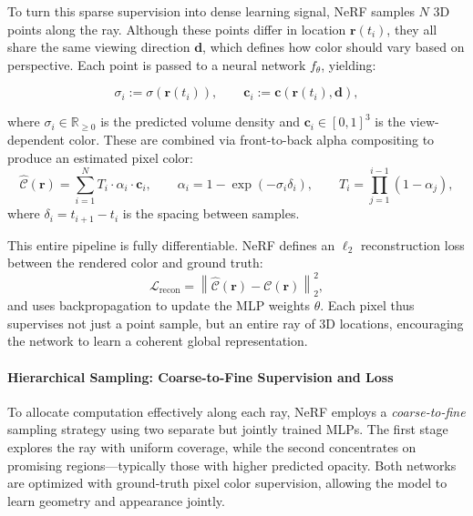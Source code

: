 \medskip

\noindent
To turn this sparse supervision into dense learning signal, NeRF samples \( N \) 3D points along the ray. Although these points differ in location \( \mathbf{r}(t_i) \), they all share the same viewing direction \( \mathbf{d} \), which defines how color should vary based on perspective. Each point is passed to a neural network \( f_\theta \), yielding:

\[
\sigma_i := \sigma(\mathbf{r}(t_i)), \qquad \mathbf{c}_i := \mathbf{c}(\mathbf{r}(t_i), \mathbf{d}),
\]

where \( \sigma_i \in \mathbb{R}_{\geq 0} \) is the predicted volume density and \( \mathbf{c}_i \in [0,1]^3 \) is the view-dependent color. These are combined via front-to-back alpha compositing to produce an estimated pixel color:
\[
\hat{\mathcal{C}}(\mathbf{r}) = \sum_{i=1}^{N} T_i \cdot \alpha_i \cdot \mathbf{c}_i, \qquad
\alpha_i = 1 - \exp(-\sigma_i \delta_i), \qquad
T_i = \prod_{j=1}^{i-1} (1 - \alpha_j),
\]
where \( \delta_i = t_{i+1} - t_i \) is the spacing between samples.

\medskip

\noindent
This entire pipeline is fully differentiable. NeRF defines an \( \ell_2 \) reconstruction loss between the rendered color and ground truth:
\[
\mathcal{L}_{\text{recon}} = \left\| \hat{\mathcal{C}}(\mathbf{r}) - \mathcal{C}(\mathbf{r}) \right\|_2^2,
\]
and uses backpropagation to update the MLP weights \( \theta \). Each pixel thus supervises not just a point sample, but an entire ray of 3D locations, encouraging the network to learn a coherent global representation.

\paragraph{Hierarchical Sampling: Coarse-to-Fine Supervision and Loss}
\label{par:chapter23_nerf_hierarchical_sampling}

To allocate computation effectively along each ray, NeRF employs a \emph{coarse-to-fine} sampling strategy using two separate but jointly trained MLPs. The first stage explores the ray with uniform coverage, while the second concentrates on promising regions—typically those with higher predicted opacity. Both networks are optimized with ground-truth pixel color supervision, allowing the model to learn geometry and appearance jointly.

